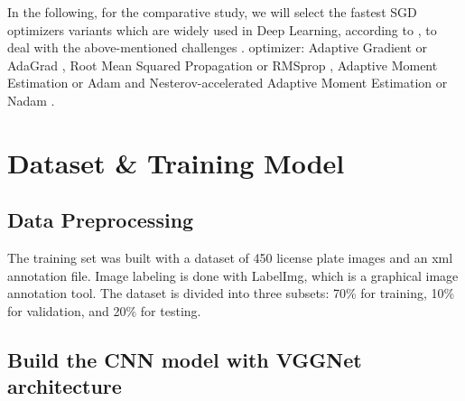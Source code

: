 \documentclass[lnbip]{svmultln}
\newcommand{\myfloatalign}{\centering}
\begin{document}
	
	In the following, for the comparative study, we will select the fastest SGD optimizers variants which are widely used in Deep Learning, according to \cite[]{geron2017hands, bottou2012stochastic}, to deal with the above-mentioned challenges \cite[]{ruder2016overview}. 
	optimizer: Adaptive Gradient or AdaGrad \cite[]{lydia2019adagrad}, Root Mean Squared Propagation or RMSprop \cite[]{geron2017hands}, Adaptive Moment Estimation or Adam \cite[]{kingma2014adam} and Nesterov-accelerated Adaptive Moment Estimation or Nadam \cite[]{lin2019nesterov,dozat2016incorporating}.


\section{Dataset \& Training Model }
\subsection{Data Preprocessing}
	
	
	The training set was built with a dataset of 450 license plate images and an xml annotation file. Image labeling is done with LabelImg, which is a graphical image annotation tool. The dataset is divided into three subsets: 70\% for training, 10\% for validation, and 20\% for testing.
	


\subsection{Build the CNN model with VGGNet architecture}

	
\end{document}
